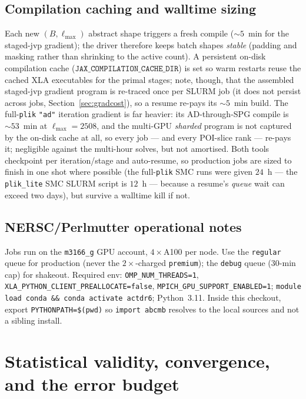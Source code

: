 \documentclass[11pt]{article}
\newcommand{\code}[1]{\texttt{\small #1}}
\newcommand{\Lmax}{\ell_{\max}}
\begin{document}
\subsection{Compilation caching and walltime sizing}
Each new $(B,\Lmax)$ abstract shape triggers a fresh compile ($\sim5$~min
for the staged-jvp gradient); the driver therefore keeps batch shapes
\emph{stable} (padding and masking rather than shrinking to the active
count). A persistent on-disk compilation cache
($\mathtt{JAX\_COMPILATION\_CACHE\_DIR}$) is set so warm restarts reuse the
cached XLA executables for the primal stages; note, though, that the
assembled staged-jvp gradient program is re-traced once per SLURM job (it
does not persist across jobs, Section~\ref{sec:gradcost}), so a resume
re-pays its $\sim5$~min build. The full-\code{plik} \code{"ad"} iteration
gradient is far heavier: its AD-through-SPG compile is $\sim53$~min at
$\Lmax=2508$, and the multi-GPU \emph{sharded} program is not captured by the
on-disk cache at all, so every job --- and every POI-slice rank --- re-pays
it; negligible against the multi-hour solves, but not amortised. Both tools
checkpoint per iteration/stage
and auto-resume, so
production jobs are sized to finish in one shot where possible (the
full-\code{plik} SMC runs were given $24$~h --- the \code{plik\_lite} SMC
SLURM script is $12$~h --- because a resume's \emph{queue} wait can exceed
two days), but survive a walltime kill if not.

\subsection{NERSC/Perlmutter operational notes}
Jobs run on the \code{m3166\_g} GPU account, $4\times$A100 per node. Use
the \code{regular} queue for production (never the $2\times$-charged
\code{premium}); the \code{debug} queue (30-min cap) for shakeout.
Required env: \code{OMP\_NUM\_THREADS=1},
\code{XLA\_PYTHON\_CLIENT\_PREALLOCATE=false},
\code{MPICH\_GPU\_SUPPORT\_ENABLED=1}; \code{module load conda \&\& conda
activate actdr6}; Python~3.11. Inside this checkout, export
\code{PYTHONPATH=\$(pwd)} so \code{import abcmb} resolves to the local
sources and not a sibling install.

\section{Statistical validity, convergence, and the error budget}
\label{sec:rigor}
\end{document}
